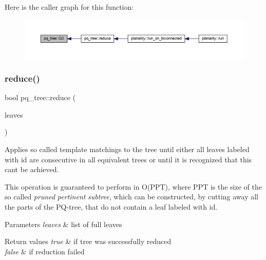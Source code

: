 Here is the caller graph for this function\+:\nopagebreak
\begin{figure}[H]
\begin{center}
\leavevmode
\includegraphics[width=350pt]{classpq__tree_aaf2d4b1daf78f11cb3377d40a8125ac1_icgraph}
\end{center}
\end{figure}
\mbox{\label{classpq__tree_a390598b675cb86952ab8cfb444056eb8}} 
\subsubsection{\texorpdfstring{reduce()}{reduce()}}
{\footnotesize\ttfamily bool pq\+\_\+tree\+::reduce (\begin{DoxyParamCaption}\item[{std\+::list$<$ \mbox{\hyperlink{classpq__leaf}{pq\+\_\+leaf}} $\ast$$>$ \&}]{leaves }\end{DoxyParamCaption})}



Applies so called template matchings to the tree until either all leaves labeled with {\ttfamily id} are consecutive in all equivalent trees or until it is recognized that this can\textquotesingle{}t be achieved. 

This operation is guaranteed to perform in O(\+P\+P\+T), where P\+PT is the size of the so called {\itshape pruned} {\itshape pertinent} {\itshape subtree}, which can be constructed, by cutting away all the parts of the P\+Q-\/tree, that do not contain a leaf labeled with {\ttfamily id}.


\begin{DoxyParams}{Parameters}
{\em leaves} & list of full leaves\\
\hline
\end{DoxyParams}

\begin{DoxyRetVals}{Return values}
{\em true} & if tree was successfully reduced \\
\hline
{\em false} & if reduction failed \\
\hline
\end{DoxyRetVals}


